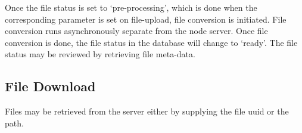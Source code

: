 Once the file status is set to `pre-processing', which is done when the corresponding parameter is set on file-upload, file conversion is initiated. File conversion runs asynchronously separate from the node server. Once file conversion is done, the file status in the database will change to `ready'. The file status may be reviewed by retrieving file meta-data. 

\subsection{File Download}
Files may be retrieved from the server either by supplying the file uuid or the path. 
